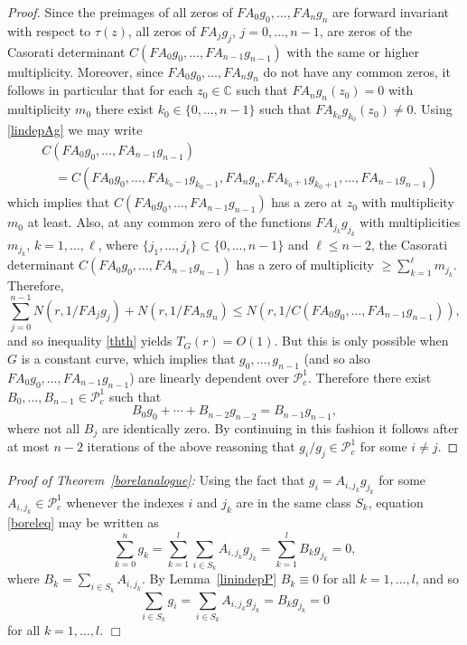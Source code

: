 \documentclass{amsart}
\newcommand{\C}{\mathbb{C}}
\theoremstyle{definition}
\numberwithin{equation}{section}
\numberwithin{theorem}{section}
\begin{document}
\begin{proof}
Since the preimages of all zeros of $FA_0g_0,\ldots,FA_ng_n$ are forward invariant with respect to $\tau(z)$, all zeros of
$FA_jg_j$, $j=0,\ldots,n-1$, are zeros of the Casorati determinant
$C(FA_0g_0,\ldots,FA_{n-1}g_{n-1})$ with the same or higher multiplicity.
Moreover, since $FA_0g_0,\ldots,FA_ng_n$ do not have any common zeros, it follows in particular that for each $z_0\in\C$ such that $FA_ng_n(z_0)=0$ with multiplicity $m_0$ there exist $k_0\in\{0,\ldots,n-1\}$ such that $FA_{k_0}g_{k_0}(z_0)\not=0$. Using \eqref{lindepAg} we may write
	\begin{equation*}
	\begin{split}
	&C(FA_0g_0,\ldots,FA_{n-1}g_{n-1})\\&\quad=C(FA_0g_0,
	\ldots,FA_{k_0-1}g_{k_0-1},FA_{n}g_{n},FA_{k_0+1}g_{k_0+1},
	\ldots,FA_{n-1}g_{n-1})
	\end{split}
	\end{equation*}	
which implies that $C(FA_0g_0,\ldots,FA_{n-1}g_{n-1})$ has a zero at $z_0$ with multiplicity $m_0$ at least. Also, at any common
zero of the functions $FA_{j_k}g_{j_k}$ with multiplicities $m_{j_k}$, $k=1,\ldots,\ell$, where $\{j_1,\ldots,j_\ell\}\subset\{0,\ldots,n-1\}$ and $\ell\leq n-2$, the Casorati determinant $C(FA_0g_0,\ldots,FA_{n-1}g_{n-1})$ has a zero of multiplicity $\geq \sum_{k=1}^\ell m_{j_k}$. Therefore,
    \begin{equation*}
    \sum_{j=0}^{n-1} N\left(r,1/FA_jg_j\right)
    + N\left(r,1/FA_ng_n\right)\leq
    N\left(r,1/C(FA_0g_0,\ldots,FA_{n-1}g_{n-1})\right),
    \end{equation*}
and so inequality \eqref{thth} yields $T_G(r)=O(1)$. But this is only possible when $G$ is a constant curve, which implies that $g_0,\ldots,g_{n-1}$ (and so also $FA_0g_0,\ldots,FA_{n-1}g_{n-1}$) are linearly dependent over $\mathcal{P}^1_c$. Therefore there exist $B_0,\ldots,B_{n-1}\in\mathcal{P}^1_c$ such that
	\begin{equation*}
	B_0g_0+\cdots + B_{n-2}g_{n-2}=B_{n-1} g_{n-1},
	\end{equation*}
where not all $B_j$ are identically zero. By continuing in this fashion it follows after at most $n-2$ iterations of the above reasoning that $g_i/g_j\in\mathcal{P}_c^1$ for some $i\not=j$.
\end{proof}

\noindent\textit{Proof of Theorem~\ref{borelanalogue}: } Using the fact that $g_i=A_{i,j_k}g_{j_k}$ for some $A_{i,j_k}\in\mathcal{P}_c^1$ whenever the indexes $i$ and $j_k$ are in the same class $S_{k}$, equation \eqref{boreleq} may be written as
	$$
	\sum_{k=0}^n g_k = \sum_{k=1}^l \sum_{i\in S_k} A_{i,j_k} g_{j_k}=\sum_{k=1}^l B_k g_{j_k}=0,
	$$
where $B_k= \sum_{i\in S_k} A_{i,j_k}$. By Lemma~\ref{linindepP} $B_k\equiv0$ for all $k=1,\ldots,l$, and so
	$$
	\sum_{i\in S_k} g_i = \sum_{i\in S_k} A_{i,j_k} g_{j_k} = B_k g_{j_k} =0
	$$	
for all $k=1,\ldots,l$. \hfill$\Box$
\end{document}
